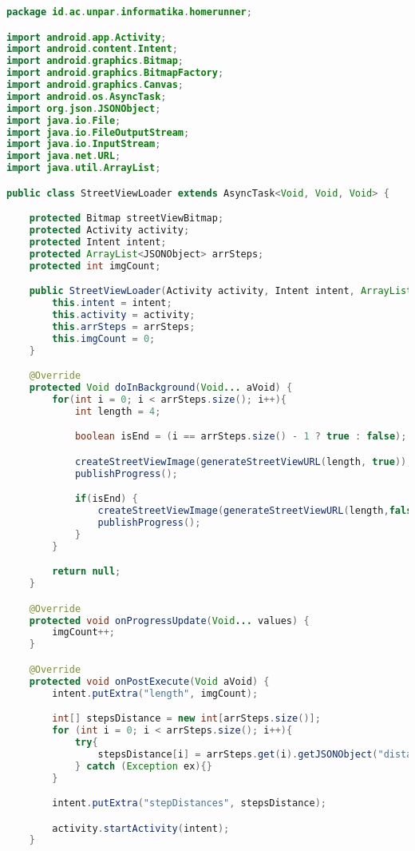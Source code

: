 \begin{lstlisting}[language=Java,caption=StreetViewLoader.java]
package id.ac.unpar.informatika.homerunner;

import android.app.Activity;
import android.content.Intent;
import android.graphics.Bitmap;
import android.graphics.BitmapFactory;
import android.graphics.Canvas;
import android.os.AsyncTask;
import org.json.JSONObject;
import java.io.File;
import java.io.FileOutputStream;
import java.io.InputStream;
import java.net.URL;
import java.util.ArrayList;

public class StreetViewLoader extends AsyncTask<Void, Void, Void> {

    protected Bitmap streetViewBitmap;
    protected Activity activity;
    protected Intent intent;
    protected ArrayList<JSONObject> arrSteps;
    protected int imgCount;

    public StreetViewLoader(Activity activity, Intent intent, ArrayList<JSONObject> arrSteps) {
        this.intent = intent;
        this.activity = activity;
        this.arrSteps = arrSteps;
        this.imgCount = 0;
    }

    @Override
    protected Void doInBackground(Void... aVoid) {
        for(int i = 0; i < arrSteps.size(); i++){
            int length = 4;

            boolean isEnd = (i == arrSteps.size() - 1 ? true : false);

            createStreetViewImage(generateStreetViewURL(length, true));
            publishProgress();

            if(isEnd) {
                createStreetViewImage(generateStreetViewURL(length,false));
                publishProgress();
            }
        }

        return null;
    }

    @Override
    protected void onProgressUpdate(Void... values) {
        imgCount++;
    }

    @Override
    protected void onPostExecute(Void aVoid) {
        intent.putExtra("length", imgCount);

        int[] stepsDistance = new int[arrSteps.size()];
        for (int i = 0; i < arrSteps.size(); i++){
            try{
                stepsDistance[i] = arrSteps.get(i).getJSONObject("distance").getInt("value");
            } catch (Exception ex){}
        }

        intent.putExtra("stepDistances", stepsDistance);

        activity.startActivity(intent);
    }


\end{lstlisting}
